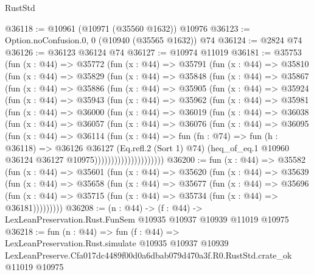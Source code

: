 \begin{lexlean}{RustStd}
\begin{coremodule}
@36118 := @10961 (@10971 (@35560 @1632)) @10976
@36123 := Option.noConfusion.{0, 0} (@10940 (@35565 @1632)) @74
@36124 := @2824 @74
@36126 := @36123 @36124 @74
@36127 := @10974 @11019
@36181 := @35753
    (fun (x : @44) =>
    @35772
      (fun (x : @44) =>
      @35791
        (fun (x : @44) =>
        @35810
          (fun (x : @44) =>
          @35829
            (fun (x : @44) =>
            @35848
              (fun (x : @44) =>
              @35867
                (fun (x : @44) =>
                @35886
                  (fun (x : @44) =>
                  @35905
                    (fun (x : @44) =>
                    @35924
                      (fun (x : @44) =>
                      @35943
                        (fun (x : @44) =>
                        @35962
                          (fun (x : @44) =>
                          @35981
                            (fun (x : @44) =>
                            @36000
                              (fun (x : @44) =>
                              @36019
                                (fun (x : @44) =>
                                @36038
                                  (fun (x : @44) =>
                                  @36057
                                    (fun (x : @44) =>
                                    @36076
                                      (fun (x : @44) =>
                                      @36095
                                        (fun (x : @44) =>
                                        @36114
                                          (fun (x : @44) =>
                                          fun (fn : @74) =>
                                          fun (h : @36118) =>
                                          @36126
                                            @36127
                                            (Eq.refl.{2} (Sort 1) @74)
                                            (heq_of_eq.{1}
                                              @10960
                                              @36124
                                              @36127
                                              @10975)))))))))))))))))))))
@36200 := fun (x : @44) =>
  @35582
    (fun (x : @44) =>
    @35601
      (fun (x : @44) =>
      @35620
        (fun (x : @44) =>
        @35639
          (fun (x : @44) =>
          @35658
            (fun (x : @44) =>
            @35677
              (fun (x : @44) =>
              @35696
                (fun (x : @44) => @35715 (fun (x : @44) => @35734 (fun (x : @44) => @36181)))))))))
@36208 := (n : @44) ->
  (f : @44) -> LexLeanPreservation.Rust.FunSem @10935 @10937 @10939 @11019 @10975
@36218 := fun (n : @44) =>
  fun (f : @44) =>
  LexLeanPreservation.Rust.simulate
    @10935
    @10937
    @10939
    LexLeanPreserve.Cfa017dc4489f00d0a6dbab079d470a3f.R0.RustStd.crate_ok
    @11019
    @10975
\end{coremodule}
\end{lexlean}
